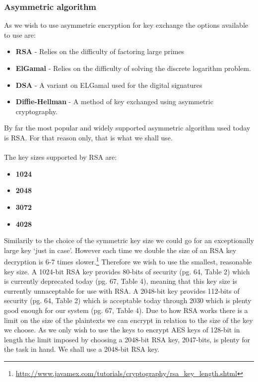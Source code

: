 \documentclass[12pt, titlepage]{article}
\begin{document}
\subsubsection{Asymmetric algorithm}
As we wish to use asymmetric encryption for key exchange the options available to use are:
\begin{itemize}
	\item \textbf{RSA} - Relies on the difficulty of factoring large primes
	\item \textbf{ElGamal} - Relies on the difficulty of solving the discrete logarithm problem.
	\item \textbf{DSA} - A variant on ELGamal used for the digital signatures
	\item \textbf{Diffie-Hellman} - A method of key exchanged using asymmetric cryptography.
\end{itemize}
By far the most popular and widely supported asymmetric algorithm used today is RSA. For that reason only, that is what we shall use.
\\
\\
The key sizes supported by RSA are:
\begin{itemize}
	\item \textbf{1024}
	\item \textbf{2048}
	\item \textbf{3072}
	\item \textbf{4028}
\end{itemize}
Similarily to the choice of the symmetric key size we could go for an exceptionally large key `just in case'. However each time we double the size of an RSA key decryption is 6-7 times slower.\footnote{\url{http://www.javamex.com/tutorials/cryptography/rsa_key_length.shtml}}
Therefore we wish to use the smallest, reasonable key size. A 1024-bit RSA key provides 80-bits of security (pg. 64, Table 2) which is currently deprecated today (pg. 67, Table 4), meaning that this key size is currently unnaceptable for use with RSA. A 2048-bit key provides 112-bits of security (pg. 64, Table 2) which is acceptable today through 2030 which is plenty good enough for our system (pg. 67, Table 4).\cite{nistKeys}
\newline \indent Due to how RSA works there is a limit on the size of the plaintexts we can encrypt in relation to the size of the key we choose. As we only wish to use the keys to encrypt AES keys of 128-bit in length the limit imposed by choosing a 2048-bit RSA key, 2047-bits, is plenty for the task in hand.
\newline We shall use a 2048-bit RSA key.
\end{document}
